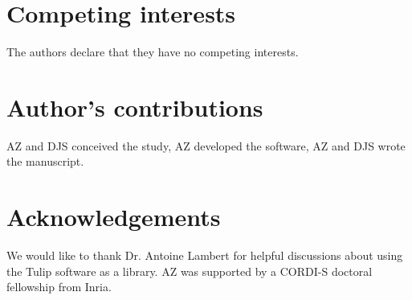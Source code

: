\documentclass{bmcart}
\begin{document}

\begin{backmatter}

\section*{Competing interests}
The authors declare that they have no competing interests.

\section*{Author's contributions}
AZ and DJS conceived the study, AZ developed the software, AZ and DJS wrote the manuscript.

\section*{Acknowledgements}
We would like to thank Dr. Antoine Lambert for helpful discussions about using the Tulip software as a library.
\noindent  
AZ was supported by a CORDI-S doctoral fellowship from Inria.





\end{backmatter}
\end{document}
